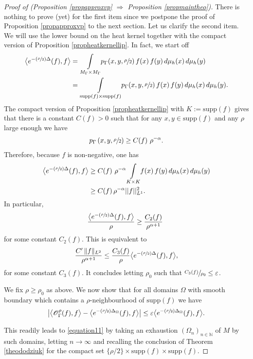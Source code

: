 \documentclass[JEP,XML,SOM,Unicode,NoFloatCountersInSection,published]{cedram}
\let\mathcal\mathscr
\let\epsilon\varepsilon
\newcommand{\Psfrac}[2]{(\sfrac{#1}{#2})}
\theoremstyle{plain}
\theoremstyle{definition}
\newcommand{\NN}{\mathbb{N}}
\newcommand{\inte}[1]{\underset{#1}{\int}}
\newcommand{\supp}[1]{\mathrm{supp}(#1)}
\begin{document}
\begin{proof}[Proof of (Proposition \ref{propapproxvp}
$\Rightarrow$ Proposition \ref{propmaintheo})]
There is nothing to prove (yet) for the first item since we postpone the proof of Proposition \ref{propapproxvp} to the next section. Let us clarify the second item. We will use the lower bound on the heat kernel together with the compact version of Proposition \ref{propheatkernellip}. In fact, we start off
\begin{align*}
\bigl< e^{- \Psfrac{\rho }{2} \Delta}(f), f \bigr> & = \inte{M_{\Gamma} \times M_{\Gamma}} p_{\Gamma}(x,y, \sfrac{\rho}{2}) \, f(x) \, f(y) \,d \mu_h(x) \,d \mu_h(y) \\
& = \inte{\supp{f} \times \supp{f}} p_{\Gamma}(x,y, \sfrac{\rho}{2}) \, f(x) \, f(y) \,d \mu_h(x) \,d \mu_h(y).
\end{align*}
The compact version of Proposition \ref{propheatkernellip} with $K := \supp{f}$ gives that there is a constant $C(f) > 0$ such that for any $x,y \in \supp{f}$ and any $\rho$ large enough we have
\[
p_{\Gamma} \left(x,y, \sfrac{\rho}{2} \right) \ge C(f) \ \rho^{- \alpha}.
\]
Therefore, because $f$ is non-negative, one has
\begin{align*}
\bigl< e^{- \Psfrac{\rho }{2} \Delta}(f), f \bigr> & \ge C(f) \ \rho^{-\alpha} \inte{K \times K} f(x)\, f(y) \,d \mu_h(x) \,d \mu_h(y) \\
& \ge C(f) \, \rho^{-\alpha} || f ||_{L^1}^2.
\end{align*}
In particular,
\[
\frac{ \bigl< e^{- \Psfrac{\rho }{2} \Delta}(f), f \bigr> }{\rho} \ge \frac{C_2(f)}{\rho^{\alpha +1}} \
\]
for some constant $C_2(f)$. This is equivalent to
\[
\frac{C' \, \|f\|_{L^2}}{\rho^{\alpha +1}} \le \frac{ C_3(f)}{\rho} \bigl< e^{- \Psfrac{\rho }{2} \Delta}(f), f \bigr>,
\]
for some constant $C_3(f)$. It concludes letting $\rho_0$ such that
$ \sfrac{ C_3(f)}{\rho_0} \le \epsilon$.

We fix $\rho \ge \rho_0$ as above. We now show that for all domains $\Omega$ with smooth boundary which contains a $\rho$-neighbourhood of $\text{supp}(f)$ we have
\begin{equation}
\label{equation12}
\bigl| \bigl< \mathcal{O}_{\Gamma}^{\rho}(f), f \bigr> - \bigl< e^{- \Psfrac{\rho}{2} \Delta_{\Omega}}(f), f \bigr> \bigr| \le \epsilon \bigl< e^{- \Psfrac{\rho}{2} \Delta_{\Omega}}(f), f \bigr>.
\end{equation}

This readily leads to \eqref{equation11} by taking an exhaustion $(\Omega_n)_{n \in \NN}$ of $M$ by such domains, letting $n \to \infty$ and recalling the conclusion of Theorem \ref{theododziuk} for the compact set $\{ \rho/2 \} \times \text{supp}(f) \times \text{supp}(f)$.


\end{proof}
\end{document}
